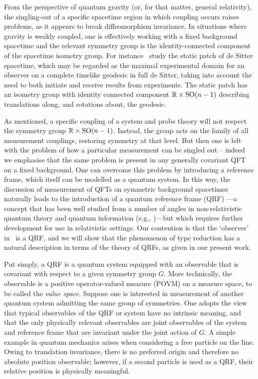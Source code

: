 \documentclass[sn-mathphys-num]{sn-jnl}%
\newcommand{\RR}{\mathbb{R}}
\numberwithin{equation}{section}
\theoremstyle{thmstyleone}%
\theoremstyle{thmstyletwo}%
\theoremstyle{thmstylethree}%
\begin{document}
From the perspective of quantum gravity (or, for that matter, general relativity), the singling-out of a specific spacetime region in which coupling occurs raises problems, as it appears to break diffeomorphism invariance. In situations where gravity is weakly coupled, one is effectively working with a fixed background spacetime and the relevant symmetry group is the identity-connected component of the spacetime isometry group. For instance~\cite{chandrasekaran2023algebra} study the static patch of de Sitter spacetime, which may be regarded as the maximal experimental  domain for an observer on a complete timelike geodesic in full de Sitter, taking into account the need to both initiate and receive results from experiments. The static patch has an isometry group with identity connected component $\RR\times\textnormal{SO}(n-1)$ describing translations along, and rotations about, the geodesic.

As mentioned, a specific coupling of a system and probe theory will not respect the symmetry group $\RR\times\textnormal{SO}(n-1)$. Instead, the group acts on the family of all measurement couplings, restoring symmetry at that level. But then one is left with the problem of how a particular measurement can be singled out -- indeed we emphasise that the same problem is present in any generally covariant QFT on a fixed background. One can overcome this problem by introducing a reference frame,
which itself can be modelled as a quantum system. 
In this way, the discussion of measurement of QFTs on symmetric background spacetimes naturally leads to the introduction of a quantum reference frame (QRF)
---a concept that has been well studied from a number of angles in non-relativistic quantum theory and quantum information (e.g., \cite{Aharonov:1967zza,Aharonov:1984zz,Bartlett2007,Vanrietvelde:2018pgb,giacomini2019quantum,de2020quantum,Loveridge2017a,carette2023operational,lake2023quantum})---but which requires further development for use in relativistic settings. Our contention is that the `observer' in~\cite{chandrasekaran2023algebra} is a QRF, and we will show that 
the phenomenon of type reduction has a natural description in terms of the theory of QRFs, as given in our present work. 

Put simply, a QRF is a quantum system equipped with an observable that is covariant with respect to a given symmetry group $G$. More technically, the observable is a positive operator-valued measure (POVM) on a measure space, to be called the \emph{value space}. 
Suppose one is interested in measurement of another quantum system admitting the same group of symmetries. One adopts the view that typical observables of the QRF or system have no intrinsic meaning, and that the only physically relevant observables are joint observables of the system and reference frame that are invariant under the joint action of $G$. A simple example in quantum mechanics arises when considering a free particle on the line. Owing to translation invariance, there is no preferred origin and therefore no absolute position observable; however, if a second particle is used as a QRF, their relative position is physically meaningful.
\end{document}
